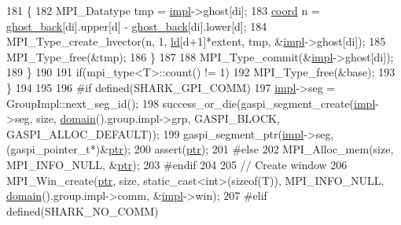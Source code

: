 \begin{DoxyCode}
181             \{
182                 MPI\_Datatype tmp = \hyperlink{classshark_1_1ndim_1_1_global_array_a70684121da4badfef791c15d7076282f}{impl}->ghost[di];
183                 \hyperlink{namespaceshark_a767a92d5dd82cb82266473bff42fa6d9}{coord} n = \hyperlink{classshark_1_1ndim_1_1_global_array_a97eb47a8cd80d98627706e673259a310}{ghost\_back}[di].upper[d] - \hyperlink{classshark_1_1ndim_1_1_global_array_a97eb47a8cd80d98627706e673259a310}{ghost\_back}[di].lower[d];
184                 MPI\_Type\_create\_hvector(n, 1, \hyperlink{classshark_1_1ndim_1_1_global_array_afdc4665e0fde4a703785436af351df49}{ld}[d+1]*extent, tmp, &\hyperlink{classshark_1_1ndim_1_1_global_array_a70684121da4badfef791c15d7076282f}{impl}->ghost[di]);
185                 MPI\_Type\_free(&tmp);
186             \}
187 
188             MPI\_Type\_commit(&\hyperlink{classshark_1_1ndim_1_1_global_array_a70684121da4badfef791c15d7076282f}{impl}->ghost[di]);
189         \}
190 
191         \textcolor{keywordflow}{if}(mpi\_type<T>::count() != 1)
192             MPI\_Type\_free(&base);
193     \}
194 
195 
196 \textcolor{preprocessor}{#if defined(SHARK\_GPI\_COMM)}
197         \hyperlink{classshark_1_1ndim_1_1_global_array_a70684121da4badfef791c15d7076282f}{impl}->seg = GroupImpl::next\_seg\_id();
198         success\_or\_die(gaspi\_segment\_create(\hyperlink{classshark_1_1ndim_1_1_global_array_a70684121da4badfef791c15d7076282f}{impl}->seg, size, \hyperlink{classshark_1_1ndim_1_1_global_array_a435ee8ff23c3feadf2ef2be64d4f375c}{domain}().group.impl->grp, 
      GASPI\_BLOCK, GASPI\_ALLOC\_DEFAULT));  
199         gaspi\_segment\_ptr(\hyperlink{classshark_1_1ndim_1_1_global_array_a70684121da4badfef791c15d7076282f}{impl}->seg, (gaspi\_pointer\_t*)&\hyperlink{classshark_1_1ndim_1_1_global_array_ad4af3b8307a3a7107186cf699b5a2432}{ptr});
200         assert(\hyperlink{classshark_1_1ndim_1_1_global_array_ad4af3b8307a3a7107186cf699b5a2432}{ptr});
201 \textcolor{preprocessor}{#else}
202     MPI\_Alloc\_mem(size, MPI\_INFO\_NULL, &\hyperlink{classshark_1_1ndim_1_1_global_array_ad4af3b8307a3a7107186cf699b5a2432}{ptr});
203 \textcolor{preprocessor}{#endif}
204 
205     \textcolor{comment}{// Create window}
206     MPI\_Win\_create(\hyperlink{classshark_1_1ndim_1_1_global_array_ad4af3b8307a3a7107186cf699b5a2432}{ptr}, size, static\_cast<int>(\textcolor{keyword}{sizeof}(T)), MPI\_INFO\_NULL, 
      \hyperlink{classshark_1_1ndim_1_1_global_array_a435ee8ff23c3feadf2ef2be64d4f375c}{domain}().group.impl->comm, &\hyperlink{classshark_1_1ndim_1_1_global_array_a70684121da4badfef791c15d7076282f}{impl}->win);
207 \textcolor{preprocessor}{#elif defined(SHARK\_NO\_COMM)}

\end{DoxyCode}
